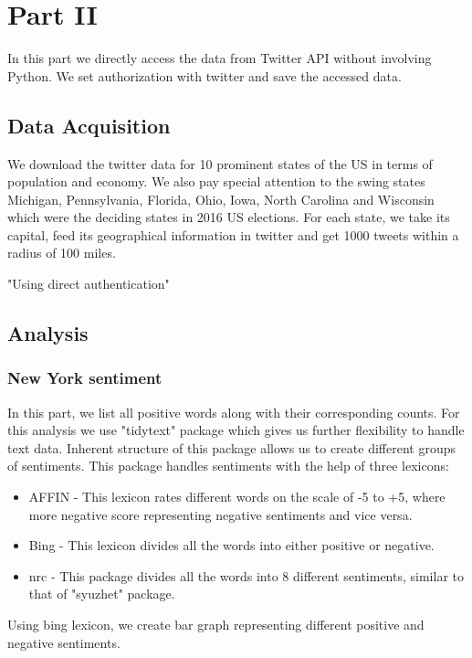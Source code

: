 \documentclass[a4paper,12pt]{book}
\theoremstyle{break}
\begin{document}
\chapter{Part II}
In this part we directly access the data from Twitter API without involving Python. We set authorization with twitter and save the accessed data.

\section{Data Acquisition}

We download the twitter data for 10 prominent states of the US in terms of population and economy. We also pay special attention to the swing states Michigan, Pennsylvania, Florida, Ohio, Iowa, North Carolina and Wisconsin which were the deciding states in 2016 US elections. For each state, we take its capital, feed its geographical information in twitter and get 1000 tweets within a radius of 100 miles. 

\begin{Schunk}
\begin{Soutput}
[1] "Using direct authentication"
\end{Soutput}
\end{Schunk}

\section{Analysis}

\subsection{New York sentiment}

In this part, we list all positive words along with their corresponding counts. For this analysis we use "tidytext" package which gives us further flexibility to handle text data. Inherent structure of this package allows us to create different groups of sentiments. This package handles sentiments with the help of three lexicons:
\begin{itemize}
\item AFFIN - This lexicon rates different words on the scale of -5 to +5, where more negative score representing negative sentiments and vice versa.
\item Bing - This lexicon divides all the words into either positive or negative.
\item nrc - This package divides all the words into 8 different sentiments, similar to that of "syuzhet" package.
\end{itemize}
Using bing lexicon, we create bar graph representing different positive and negative sentiments.
\end{document}
